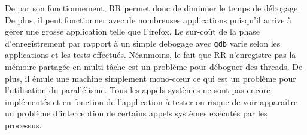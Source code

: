 De par son fonctionnement, RR permet donc de diminuer le temps de débogage. De
plus, il peut fonctionner avec de nombreuses applications puisqu'il arrive à
gérer une grosse application telle que Firefox. Le sur-coût de la phase
d'enregistrement par rapport à un simple debogage avec \texttt{gdb} varie selon les
applications et les tests effectués. Néanmoins, le fait que RR n'enregistre pas
la mémoire partagée en multi-tâche est un problème pour déboguer des threads. De
plus, il émule une machine simplement mono-c\oe ur ce qui est un problème pour
l'utilisation du parallélisme. Tous les appels systèmes ne sont pas encore
implémentés et en fonction de l'application à tester on risque de voir
apparaître un problème d'interception de certains appels systèmes exécutés par
les processus.
